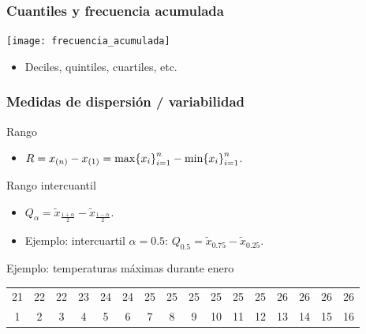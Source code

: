 \documentclass[table]{beamer}
\begin{document}
\begin{frame}
    \frametitle{Cuantiles y frecuencia acumulada}
    \begin{center}
        \texttt{[image: frecuencia\_acumulada]}
    \end{center}
    \begin{block}{}
        \begin{itemize}
            \item Deciles, quintiles, cuartiles, etc.
        \end{itemize}
    \end{block}
\end{frame}

\begin{frame}
    \frametitle{Medidas de dispersión / variabilidad}
    \begin{block}{Rango}
        \begin{itemize}
            \item $R = x_{\parens{n}} - x_{\parens{1}} = \max \bparens{x_{i}}_{i = 1}^{n} - \min \bparens{x_{i}}_{i = 1}^{n}$.%
        \end{itemize}
    \end{block}
    \begin{block}{Rango intercuantil}
        \begin{itemize}
            \item ${Q}_{\alpha} = \tilde{x}_{\frac{1 + \alpha}{2}} - \tilde{x}_{\frac{1 - \alpha}{2}}$.
            \item Ejemplo: intercuartil $\alpha = 0.5$: $Q_{0.5} = \tilde{x}_{0.75} - \tilde{x}_{0.25}$.
        \end{itemize}
    \end{block}
    \begin{exampleblock}{Ejemplo: temperaturas máximas durante enero}
        \begin{center}
                \footnotesize
                \begin{tabular}{cccccccccccccccc}
                    21 & 22 & 22 & 23 & 24 & 24 & 25 & 25 & 25 & 25 & 25 & 25 & 26 & 26 & 26 & 26 \\
                    1 & 2 & 3 & 4 & 5 & 6 & 7 & 8 & 9 & 10 & 11 & 12 & 13 & 14 & 15 & 16 \\
                    \hline

\end{tabular}
\end{center}
\end{exampleblock}
\end{frame}
\end{document}
